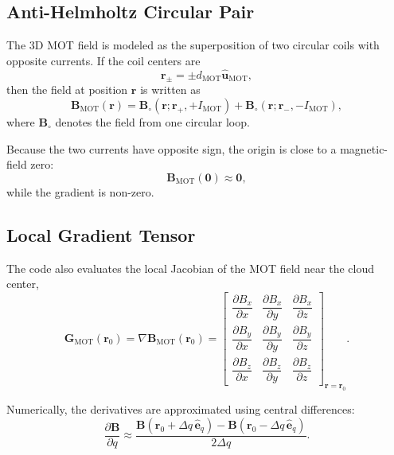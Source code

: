 \documentclass[12pt,a4paper]{article}
\begin{document}
\subsection{Anti-Helmholtz Circular Pair}

The 3D MOT field is modeled as the superposition of two circular coils with opposite currents. If the coil centers are
\begin{equation}
  \bm{r}_{\pm} = \pm d_{\mathrm{MOT}} \hat{\bm{u}}_{\mathrm{MOT}},
\end{equation}
then the field at position $\bm{r}$ is written as
\begin{equation}
  \bm{B}_{\mathrm{MOT}}(\bm{r})
  =
  \bm{B}_{\circ}\!\left(\bm{r}; \bm{r}_{+}, +I_{\mathrm{MOT}}\right)
  +
  \bm{B}_{\circ}\!\left(\bm{r}; \bm{r}_{-}, -I_{\mathrm{MOT}}\right),
\end{equation}
where $\bm{B}_{\circ}$ denotes the field from one circular loop.

Because the two currents have opposite sign, the origin is close to a magnetic-field zero:
\begin{equation}
  \bm{B}_{\mathrm{MOT}}(\bm{0}) \approx \bm{0},
\end{equation}
while the gradient is non-zero.

\subsection{Local Gradient Tensor}

The code also evaluates the local Jacobian of the MOT field near the cloud center,
\begin{equation}
  \bm{G}_{\mathrm{MOT}}(\bm{r}_0)
  =
  \nabla \bm{B}_{\mathrm{MOT}}(\bm{r}_0)
  =
  \begin{bmatrix}
    \dfrac{\partial B_x}{\partial x} &
    \dfrac{\partial B_x}{\partial y} &
    \dfrac{\partial B_x}{\partial z} \\
    \dfrac{\partial B_y}{\partial x} &
    \dfrac{\partial B_y}{\partial y} &
    \dfrac{\partial B_y}{\partial z} \\
    \dfrac{\partial B_z}{\partial x} &
    \dfrac{\partial B_z}{\partial y} &
    \dfrac{\partial B_z}{\partial z}
  \end{bmatrix}_{\bm{r}=\bm{r}_0}.
\end{equation}

Numerically, the derivatives are approximated using central differences:
\begin{equation}
  \frac{\partial \bm{B}}{\partial q}
  \approx
  \frac{\bm{B}(\bm{r}_0+\Delta q\,\hat{\bm{e}}_q)-\bm{B}(\bm{r}_0-\Delta q\,\hat{\bm{e}}_q)}{2\Delta q}.
\end{equation}
\end{document}
